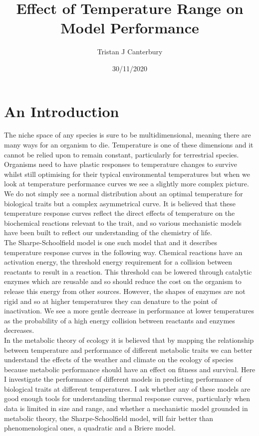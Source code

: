 \documentclass[12pt]{article}
\title{Effect of Temperature Range on Model Performance}
\author{Tristan J Canterbury}
\date{30/11/2020}
\begin{document}
  \maketitle

  \begin{abstract}
  

  \end{abstract}

  \section{An Introduction}
  The niche space of any species is sure to be multidimensional, meaning there are many ways for an organism to die. Temperature is one of these dimensions and it cannot be relied upon to remain constant, particularly for terrestrial species. Organisms need to have plastic responses to temperature changes to survive whilst still optimising for their typical environmental temperatures but when we look at temperature performance curves we see a slightly more complex picture. We do not simply see a normal distribution about an optimal temperature for biological traits but a complex asymmetrical curve. It is believed that these temperature response curves reflect the direct effects of temperature on the biochemical reactions relevant to the trait, and so various mechanistic models have been built to reflect our understanding of the chemistry of life.
  \\The Sharpe-Schoolfield model is one such model that and it describes temperature response curves in the following way. Chemical reactions have an activation energy, the threshold energy requirement for a collision between reactants to result in a reaction. This threshold can be lowered through catalytic enzymes which are reusable and so should reduce the cost on the organism to release this energy from other sources. However, the shapes of enzymes are not rigid and so at higher temperatures they can denature to the point of inactivation. We see a more gentle decrease in performance at lower temperatures as the probability of a high energy collision between reactants and enzymes decreases.
  \\In the metabolic theory of ecology it is believed that by mapping the relationship between temperature and performance of different metabolic traits we can better understand the effects of the weather and climate on the ecology of species because metabolic performance should have an effect on fitness and survival. 
  Here I investigate the performance of different models in predicting performance of biological traits at different temperatures. I ask whether any of these models are good enough tools for understanding thermal response curves, particularly when data is limited in size and range, and whether a mechanistic model grounded in metabolic theory, the Sharpe-Schoolfield model, will fair better than phenomenological ones, a quadratic and a Briere model.
\end{document}
